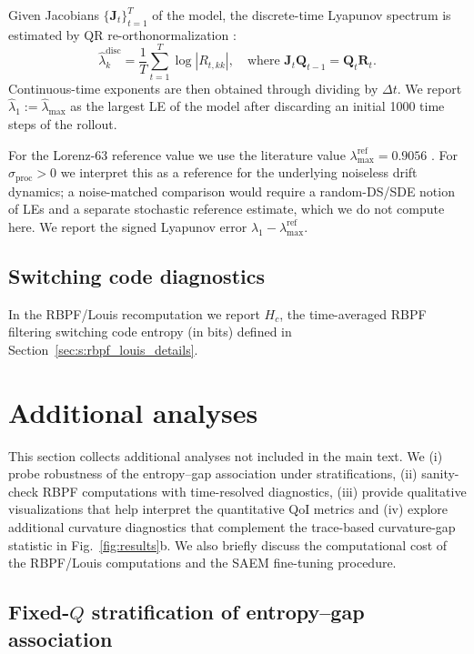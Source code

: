 \documentclass[twoside]{article}
\theoremstyle{plain}
\theoremstyle{definition}
\theoremstyle{remark}
\begin{document}
Given Jacobians $\{\bm{J}_t\}_{t=1}^T$ of the model, the discrete-time Lyapunov spectrum is estimated by QR re-orthonormalization \citep{benettin1980lyapunov}:
\begin{equation}
\widehat{\lambda}_k^{\mathrm{disc}} = \frac{1}{T}\sum_{t=1}^T \log\left|R_{t,kk}\right|,\quad \text{where } \bm{J}_t\bm{Q}_{t-1}=\bm{Q}_t\bm{R}_t.
\end{equation}
Continuous-time exponents are then obtained through dividing by $\Delta t$.
We report $\widehat{\lambda}_1 := \widehat{\lambda}_{\mathrm{max}}$ as the largest LE of the model after discarding an initial 1000 time steps of the rollout.

For the Lorenz-63 reference value we use the literature value $\lambda_{\mathrm{max}}^{\mathrm{ref}}=0.9056$ \citep{sparrow1982lorenz}. For $\sigma_{\mathrm{proc}} > 0$ we interpret this as a reference for the underlying noiseless drift dynamics; a noise-matched comparison would require a random-DS/SDE notion of LEs and a separate stochastic reference estimate, which we do not compute here. We report the signed Lyapunov error $\widehat{\lambda}_1-\lambda_{\mathrm{max}}^{\mathrm{ref}}$.

\subsection{Switching code diagnostics}
In the RBPF/Louis recomputation we report $H_c$, the time-averaged RBPF filtering switching code entropy (in bits) defined in Section~\ref{sec:s:rbpf_louis_details}.

\section{Additional analyses}
\label{sec:s:optional}
This section collects additional analyses not included in the main text. We (i) probe robustness of the entropy--gap association under stratifications, (ii) sanity-check RBPF computations with time-resolved diagnostics, (iii) provide qualitative visualizations that help interpret the quantitative QoI metrics and (iv) explore additional curvature diagnostics that complement the trace-based curvature-gap statistic in Fig.~\ref{fig:results}b. We also briefly discuss the computational cost of the RBPF/Louis computations and the SAEM fine-tuning procedure.

\subsection[Fixed-Q stratification of entropy--gap association]{Fixed-$Q$ stratification of entropy--gap association}
\label{sec:s:fixedQ_strat}
\end{document}
